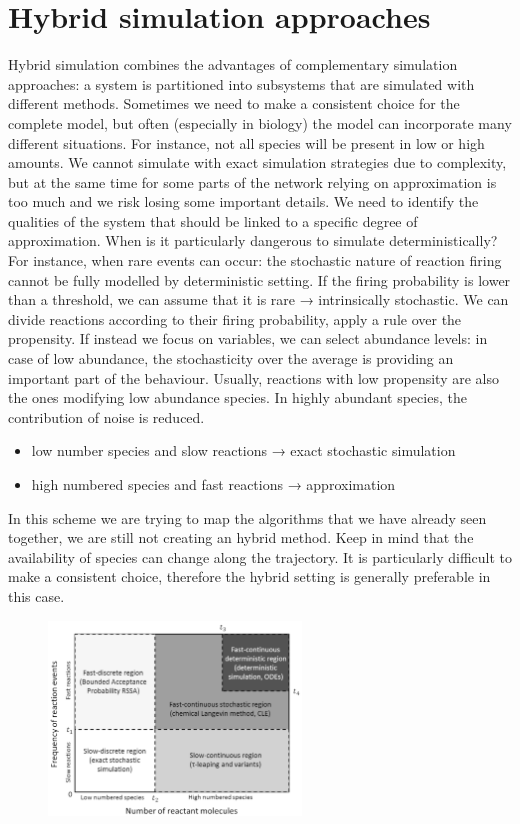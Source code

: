 \graphicspath{{chapters/06/images/}}
\chapter{Hybrid simulation approaches}
Hybrid simulation combines the advantages of complementary simulation approaches: a system is partitioned into subsystems that are simulated with different methods.
Sometimes we need to make a consistent choice for the complete model, but often (especially in biology) the model can incorporate many different situations.
For instance, not all species will be present in low or high amounts.
We cannot simulate with exact simulation strategies due to complexity, but at the same time for some parts of the network relying on approximation is too much and we risk losing some important details.
We need to identify the qualities of the system that should be linked to a specific degree of approximation.
When is it particularly dangerous to simulate deterministically? For instance, when rare events can occur: the stochastic nature of reaction firing cannot be fully modelled by deterministic setting.
If the firing probability is lower than a threshold, we can assume that it is rare → intrinsically stochastic.
We can divide reactions according to their firing probability, apply a rule over the propensity.
If instead we focus on variables, we can select abundance levels: in case of low abundance, the stochasticity over the average is providing an important part of the behaviour.
Usually, reactions with low propensity are also the ones modifying low abundance species.
In highly abundant species, the contribution of noise is reduced.

\begin{itemize}
  \item low number species and slow reactions → exact stochastic simulation
  \item high numbered species and fast reactions → approximation
\end{itemize}

In this scheme we are trying to map the algorithms that we have already seen together, we are still not creating an hybrid method.
Keep in mind that the availability of species can change along the trajectory.
It is particularly difficult to make a consistent choice, therefore the hybrid setting is generally preferable in this case.

\begin{figure}
\includegraphics[width=0.6\textwidth]{regions.png}
\end{figure}

